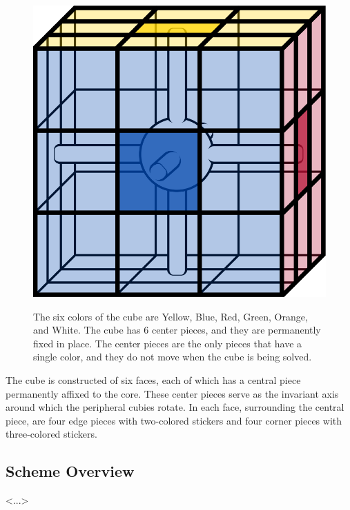 \documentclass[12pt]{article}
\begin{document}
\begin{figure}[H]
    \hspace{20pt}
    \begin{minipage}{.3\textwidth}
        \includegraphics[scale=0.1]{core.png}
    \end{minipage}%
    \begin{minipage}{.6\textwidth}
        The six colors of the cube are Yellow, Blue, Red, Green, Orange, and White. The cube has 6 center pieces, and they are permanently fixed in place. The center pieces are the only pieces that have a single color, and they do not move when the cube is being solved.\\
    \end{minipage}
\end{figure}

The cube is constructed of six faces, each of which has a central piece permanently affixed to the core. These center pieces serve as the invariant axis around which the peripheral cubies rotate. In each face, surrounding the central piece, are four edge pieces with two-colored stickers and four corner pieces with three-colored stickers.\\

\subsection{Scheme Overview}
<...>
\end{document}
